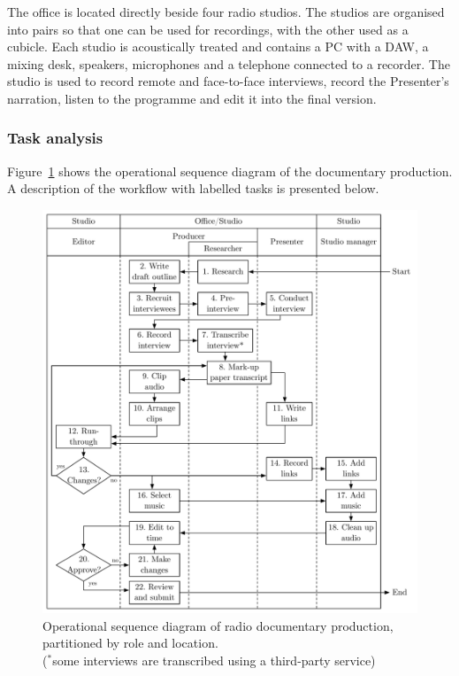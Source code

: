 The office is located directly beside four radio studios. The studios are organised into pairs so that one can be used
for recordings, with the other used as a cubicle. Each studio is acoustically treated and contains a PC with a DAW,
a mixing desk, speakers, microphones and a telephone connected to a recorder. The studio is used to record remote and
face-to-face interviews, record the Presenter's narration, listen to the programme and edit it into the final
version.

\subsubsection{Task analysis}
Figure~\ref{fig:ethno-docs-workflow} shows the operational sequence diagram of the documentary production.  A
description of the workflow with labelled tasks is presented below.

\begin{figure}
  \centering
  \includegraphics[width=\columnwidth]{figs/docs-workflow.pdf}
  \caption[Operational sequence diagram of radio documentary production, partitioned by role and location.]{Operational
  sequence diagram of radio documentary production, partitioned by role and location.\\ {\footnotesize ($^{*}$some
  interviews are transcribed using a third-party service)}}
  \label{fig:ethno-docs-workflow}
\end{figure}

